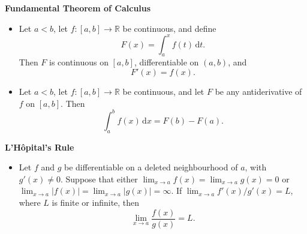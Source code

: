 \documentclass[11pt,a4paper,fleqn]{article}
\newcommand{\dd}{\,\mathrm{d}}
\newcommand{\theoremheading}[1]{%
  \Needspace{7\baselineskip}%
  \par\vspace{0.3em}\noindent\textbf{#1}\par\nobreak\vspace{-0.25em}%
}
\newenvironment{theoremlist}
  {\begingroup
   \setlength{\abovedisplayskip}{0.3em}%
   \setlength{\belowdisplayskip}{0.3em}%
   \setlength{\abovedisplayshortskip}{0.2em}%
   \setlength{\belowdisplayshortskip}{0.2em}%
   \begin{itemize}[
      label=\(\bullet\),
      leftmargin=1.65em,
      labelsep=0.55em,
      itemsep=0.3em,
      topsep=0pt,
      parsep=0pt,
      partopsep=0pt
    ]}
  {\end{itemize}\endgroup}
\begin{document}
\theoremheading{Fundamental Theorem of Calculus}
\begin{theoremlist}
\item Let \(a<b\), let \(f:[a,b]\to\mathbb R\) be continuous, and define
      \[
      F(x)=\int_a^x f(t)\dd t.
      \]
      Then \(F\) is continuous on \([a,b]\), differentiable on
      \((a,b)\), and
      \[
      F'(x)=f(x).
      \]
\item Let \(a<b\), let \(f:[a,b]\to\mathbb R\) be continuous, and let \(F\) be any
      antiderivative of \(f\) on \([a,b]\). Then
      \[
      \int_a^b f(x)\dd x=F(b)-F(a).
      \]
\end{theoremlist}

\theoremheading{L'H\^opital's Rule}
\begin{theoremlist}
\item Let \(f\) and \(g\) be differentiable on a deleted neighbourhood
      of \(a\), with \(g'(x)\ne0\). Suppose that either
      \(\lim_{x\to a}f(x)=\lim_{x\to a}g(x)=0\) or
      \(\lim_{x\to a}|f(x)|=\lim_{x\to a}|g(x)|=\infty\).
      If \(\lim_{x\to a}f'(x)/g'(x)=L\), where \(L\) is finite or
      infinite, then
      \[
      \lim_{x\to a}\frac{f(x)}{g(x)}=L.
      \]
\end{theoremlist}
\end{document}
